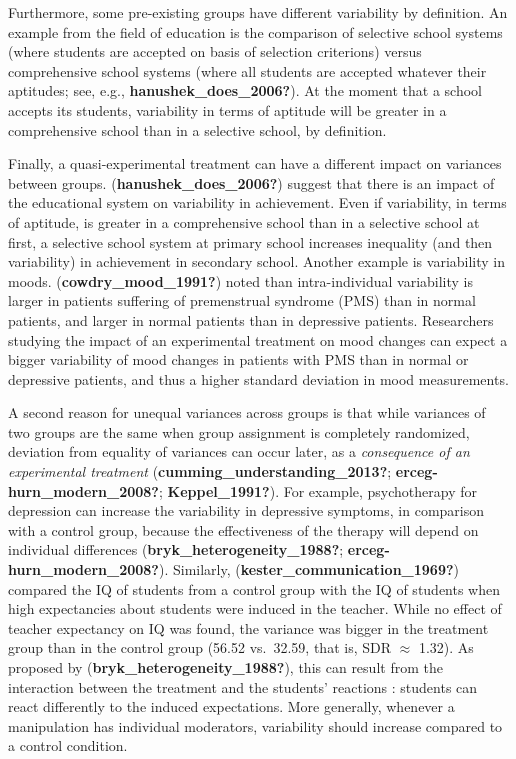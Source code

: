 \documentclass[
  english,
  man]{apa6}
\begin{document}
Furthermore, some pre-existing groups have different variability by definition. An example from the field of education is the comparison of selective school systems (where students are accepted on basis of selection criterions) versus comprehensive school systems (where all students are accepted whatever their aptitudes; see, e.g., \textbf{hanushek\_does\_2006?}). At the moment that a school accepts its students, variability in terms of aptitude will be greater in a comprehensive school than in a selective school, by definition.

Finally, a quasi-experimental treatment can have a different impact on variances between groups. (\textbf{hanushek\_does\_2006?}) suggest that there is an impact of the educational system on variability in achievement. Even if variability, in terms of aptitude, is greater in a comprehensive school than in a selective school at first, a selective school system at primary school increases inequality (and then variability) in achievement in secondary school. Another example is variability in moods. (\textbf{cowdry\_mood\_1991?}) noted than intra-individual variability is larger in patients suffering of premenstrual syndrome (PMS) than in normal patients, and larger in normal patients than in depressive patients. Researchers studying the impact of an experimental treatment on mood changes can expect a bigger variability of mood changes in patients with PMS than in normal or depressive patients, and thus a higher standard deviation in mood measurements.

A second reason for unequal variances across groups is that while variances of two groups are the same when group assignment is completely randomized, deviation from equality of variances can occur later, as a \emph{consequence of an experimental treatment} (\textbf{cumming\_understanding\_2013?}; \textbf{erceg-hurn\_modern\_2008?}; \textbf{Keppel\_1991?}). For example, psychotherapy for depression can increase the variability in depressive symptoms, in comparison with a control group, because the effectiveness of the therapy will depend on individual differences (\textbf{bryk\_heterogeneity\_1988?}; \textbf{erceg-hurn\_modern\_2008?}). Similarly, (\textbf{kester\_communication\_1969?}) compared the IQ of students from a control group with the IQ of students when high expectancies about students were induced in the teacher. While no effect of teacher expectancy on IQ was found, the variance was bigger in the treatment group than in the control group (56.52 vs.~32.59, that is, SDR \(\approx\) 1.32). As proposed by (\textbf{bryk\_heterogeneity\_1988?}), this can result from the interaction between the treatment and the students' reactions : students can react differently to the induced expectations. More generally, whenever a manipulation has individual moderators, variability should increase compared to a control condition.
\end{document}
